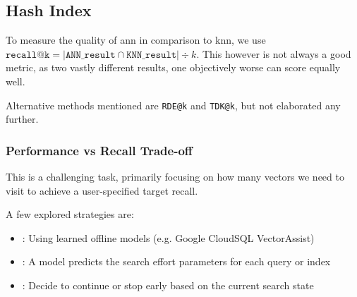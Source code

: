 \subsection{Hash Index}
To measure the quality of \acrshort{ann} in comparison to \acrshort{knn}, we use $\texttt{recall@k} = |\texttt{ANN\_result} \cap \texttt{KNN\_result}| \div k$.
This however is not always a good metric, as two vastly different results, one objectively worse can score equally well.

Alternative methods mentioned are \texttt{RDE@k} and \texttt{TDK@k}, but not elaborated any further.


\subsubsection{Performance vs Recall Trade-off}
This is a challenging task, primarily focusing on how many vectors we need to visit to achieve a user-specified target recall.

A few explored strategies are:
\begin{itemize}
    \item {}: Using learned offline models (e.g. Google CloudSQL VectorAssist)
    \item {}: A model predicts the search effort parameters for each query or index
    \item {}: Decide to continue or stop early based on the current search state
\end{itemize}
